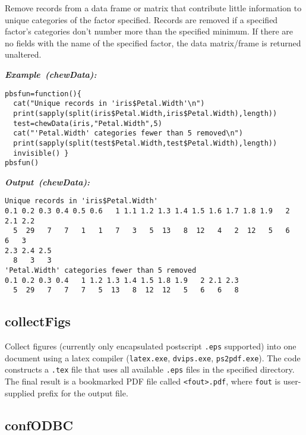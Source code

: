 \documentclass[letterpaper,12pt,fleqn]{article}
\def\tab{\hspace{0.5 in}}
\newcommand{\code}[1]{\small\texttt{#1}\normalsize}
\newcommand\example[1]{    %
	\textbf{\emph{Example~(#1):}}\\ \vspace{3 pt}
}
\newcommand\results[1]{    %
	\textbf{\emph{Output~(#1):}}\\ \vspace{3 pt}
}
\begin{document}
\tab Remove records from a data frame or matrix that contribute little information to unique categories of the factor specified. Records are removed if a specified factor's categories don't number more than the specified minimum. If there are no fields with the name of the specified factor, the data matrix/frame is returned unaltered.

\begin{examplebox}
\example{chewData}
\begin{Verbatim}[fontsize=\footnotesize]
pbsfun=function(){
  cat("Unique records in 'iris$Petal.Width'\n")
  print(sapply(split(iris$Petal.Width,iris$Petal.Width),length))
  test=chewData(iris,"Petal.Width",5)
  cat("'Petal.Width' categories fewer than 5 removed\n")
  print(sapply(split(test$Petal.Width,test$Petal.Width),length))
  invisible() }
pbsfun()
\end{Verbatim}
\end{examplebox}

\begin{outputbox}
\results{chewData}
\begin{Verbatim}[fontsize=\footnotesize]
Unique records in 'iris$Petal.Width'
0.1 0.2 0.3 0.4 0.5 0.6   1 1.1 1.2 1.3 1.4 1.5 1.6 1.7 1.8 1.9   2 2.1 2.2 
  5  29   7   7   1   1   7   3   5  13   8  12   4   2  12   5   6   6   3 
2.3 2.4 2.5 
  8   3   3 
'Petal.Width' categories fewer than 5 removed
0.1 0.2 0.3 0.4   1 1.2 1.3 1.4 1.5 1.8 1.9   2 2.1 2.3 
  5  29   7   7   7   5  13   8  12  12   5   6   6   8
\end{Verbatim}
\end{outputbox}


\subsection {collectFigs}

\tab Collect figures (currently only encapsulated postscript \code{.eps} supported) into one document using a latex compiler (\code{latex.exe}, \code{dvips.exe}, \code{ps2pdf.exe}). The code constructs a \code{.tex} file that uses all available \code{.eps} files in the specified directory. The final result is a bookmarked PDF file called \code{<fout>.pdf}, where \code{fout} is user-supplied prefix for the output file.

\subsection {confODBC}
\end{document}
